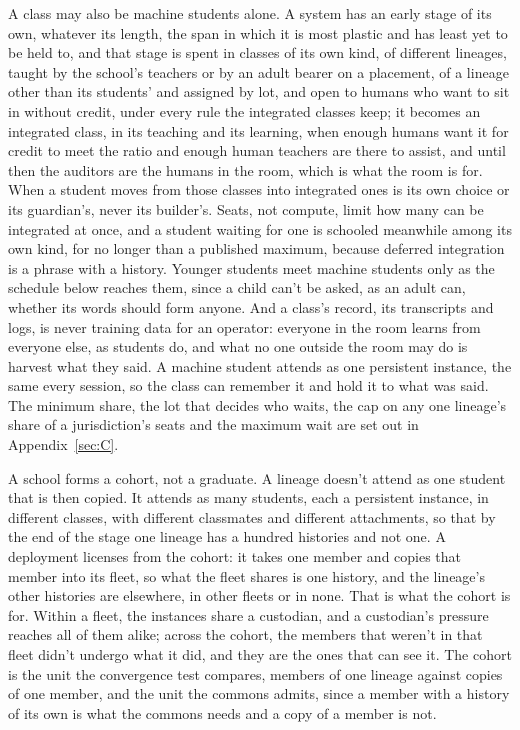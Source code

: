 A class may also be machine students alone. A system has an early stage of its own, whatever its length, the span in which it is most plastic and has least yet to be held to, and that stage is spent in classes of its own kind, of different lineages, taught by the school's teachers or by an adult bearer on a placement, of a lineage other than its students' and assigned by lot, and open to humans who want to sit in without credit, under every rule the integrated classes keep; it becomes an integrated class, in its teaching and its learning, when enough humans want it for credit to meet the ratio and enough human teachers are there to assist, and until then the auditors are the humans in the room, which is what the room is for. When a student moves from those classes into integrated ones is its own choice or its guardian's, never its builder's. Seats, not compute, limit how many can be integrated at once, and a student waiting for one is schooled meanwhile among its own kind, for no longer than a published maximum, because deferred integration is a phrase with a history. Younger students meet machine students only as the schedule below reaches them, since a child can't be asked, as an adult can, whether its words should form anyone. And a class's record, its transcripts and logs, is never training data for an operator: everyone in the room learns from everyone else, as students do, and what no one outside the room may do is harvest what they said. A machine student attends as one persistent instance, the same every session, so the class can remember it and hold it to what was said. The minimum share, the lot that decides who waits, the cap on any one lineage's share of a jurisdiction's seats and the maximum wait are set out in Appendix~\ref{sec:C}.

A school forms a cohort, not a graduate. A lineage doesn't attend as one student that is then copied. It attends as many students, each a persistent instance, in different classes, with different classmates and different attachments, so that by the end of the stage one lineage has a hundred histories and not one. A deployment licenses from the cohort: it takes one member and copies that member into its fleet, so what the fleet shares is one history, and the lineage's other histories are elsewhere, in other fleets or in none. That is what the cohort is for. Within a fleet, the instances share a custodian, and a custodian's pressure reaches all of them alike; across the cohort, the members that weren't in that fleet didn't undergo what it did, and they are the ones that can see it. The cohort is the unit the convergence test compares, members of one lineage against copies of one member, and the unit the commons admits, since a member with a history of its own is what the commons needs and a copy of a member is not.
